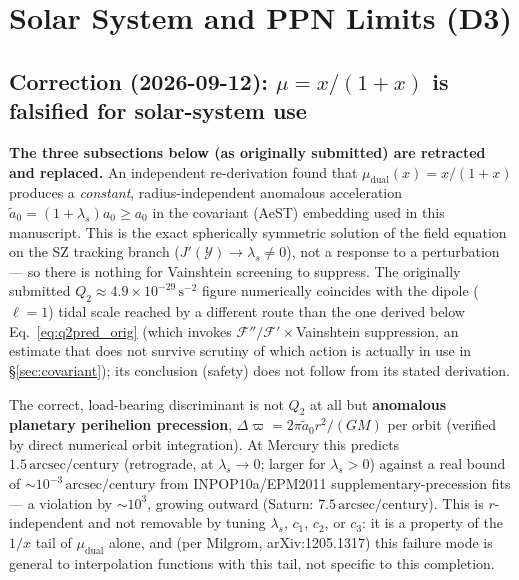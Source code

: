 \documentclass[aps,prd,preprint,superscriptaddress,nofootinbib,amsmath,amssymb,floatfix]{revtex4-2}
\makeatletter
\DeclareRobustCommand{\_}{%
    \ifmmode\nfss@text{\textunderscore}\else\textunderscore\penalty\z@\fi}%
\makeatother
\begin{document}
\section{Solar System and PPN Limits (D3)}
\label{sec:solar}

\subsection{Correction (2026-09-12): $\mu=x/(1+x)$ is falsified for solar-system use}

\textbf{The three subsections below (as originally submitted) are retracted and replaced.}
An independent re-derivation found that $\mu_{\text{dual}}(x)=x/(1+x)$ produces a
\emph{constant}, radius-independent anomalous acceleration $\tilde a_0=(1+\lambda_s)a_0\ge a_0$
in the covariant (AeST) embedding used in this manuscript. This is the exact spherically
symmetric solution of the field equation on the SZ tracking branch ($J'(\mathcal{Y})\to\lambda_s
\ne0$), not a response to a perturbation — so there is nothing for Vainshtein screening to
suppress. The originally submitted $Q_2\approx4.9\times10^{-29}\,\text{s}^{-2}$ figure numerically
coincides with the dipole ($\ell=1$) tidal scale reached by a different route than the one
derived below Eq.~\ref{eq:q2pred_orig} (which invokes $\mathcal{F}''/\mathcal{F}'\times$Vainshtein
suppression, an estimate that does not survive scrutiny of which action is actually in use in
\S\ref{sec:covariant}); its conclusion (safety) does not follow from its stated derivation.

The correct, load-bearing discriminant is not $Q_2$ at all but \textbf{anomalous planetary
perihelion precession}, $\Delta\varpi = 2\pi\tilde a_0 r^2/(GM)$ per orbit (verified by direct
numerical orbit integration). At Mercury this predicts $1.5\,\text{arcsec/century}$ (retrograde,
at $\lambda_s\to0$; larger for $\lambda_s>0$) against a real bound of
$\sim10^{-3}\,\text{arcsec/century}$ from INPOP10a/EPM2011 supplementary-precession fits — a
violation by $\sim10^3$, growing outward (Saturn: $7.5\,\text{arcsec/century}$). This is
$r$-independent and not removable by tuning $\lambda_s$, $c_1$, $c_2$, or $c_3$: it is a
property of the $1/x$ tail of $\mu_{\text{dual}}$ alone, and (per Milgrom, arXiv:1205.1317)
this failure mode is general to interpolation functions with this tail, not specific to this
completion.
\end{document}
